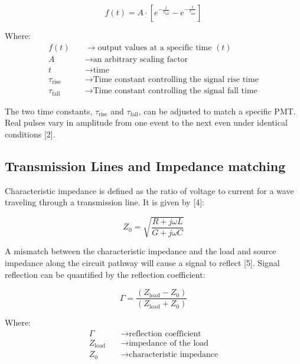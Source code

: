 \documentclass[10pt]{article}
\begin{document}
$$
f(t) = A \cdot \left[ e^{-\frac{t}{\tau_{\text{fall}}}} - e^{-\frac{t}{\tau_{\text{rise}}}} \right]
$$


Where:
\begin{align*}
f(t) &\quad\to \text{output values at a specific time } (t) \\
A    &\quad\to \text{an arbitrary scaling factor} \\
t    &\quad\to \text{time} \\
\tau_{\text{rise}} &\quad\to \text{Time constant controlling the signal rise time}\\
\tau_{\text{fall}} &\quad\to \text{Time constant controlling the signal fall time}
\end{align*}


The two time constants, ${\tau_{\text{rise}}}$ and ${\tau_{\text{fall}}}$, can be adjusted to match a specific PMT. Real pulses vary in amplitude from one event to the next even under identical conditions [2].


\subsection{Transmission Lines and Impedance matching}

Characteristic impedance is defined as the ratio of voltage to current for a wave traveling through a transmission line. It is given by [4]:

$$Z_0 = \sqrt{\frac{R + j\omega L}{G + j\omega C}}$$


A mismatch between the characteristic impedance and the load and source impedance along the circuit pathway will cause a signal to reflect [5]. Signal reflection can be quantified by the reflection coefficient:

$$
\Gamma = \frac{(Z_{\text{load}} - Z_0)}{(Z_{\text{load}} + Z_0)}
$$

Where:
\begin{align*}
\Gamma &\quad\to \text{reflection coefficient} \\
Z_{\text{load}}    &\quad\to \text{impedance of the load} \\
Z_0    &\quad\to \text{characteristic impedance} \\
\end{align*}
\end{document}
